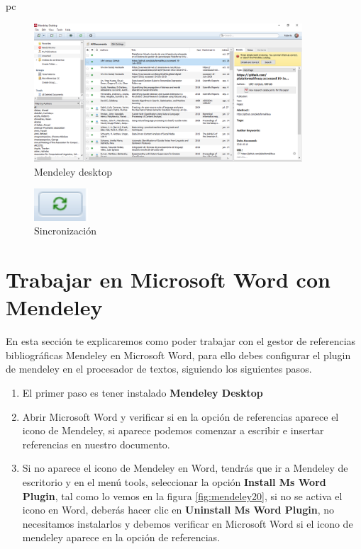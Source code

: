 pc\documentclass[a4paper,12pt,openany]{book}
\begin{document}
\begin{itemize}
\begin{enumerate}
    \begin{figure}[H]
    \centering
	\includegraphics[width=10cm]{mendeley3.png}
    \caption{Mendeley desktop}
    \label{fig:mendeley18}
    \end{figure}

    \begin{figure}[H]
    \centering
	\includegraphics[width=2cm]{mendeley5.png}
    \caption{Sincronización}
    \label{fig:mendeley19}
    \end{figure}
\end{enumerate}

\section{Trabajar en Microsoft Word con Mendeley}

En esta sección te explicaremos como poder trabajar con el gestor de referencias bibliográficas Mendeley en Microsoft Word, para ello debes configurar el plugin de mendeley en el procesador de textos, siguiendo los siguientes pasos.

\begin{enumerate}
    \item El primer paso es tener instalado \textbf{Mendeley Desktop}
    \item Abrir Microsoft Word y verificar si en la opción de referencias aparece el icono de Mendeley, si aparece podemos comenzar a escribir e insertar referencias en nuestro documento.
    \item Si no aparece el icono de Mendeley en Word, tendrás que ir a Mendeley de escritorio y en el menú tools, seleccionar la opción \textbf{Install Ms Word Plugin}, tal como lo vemos en la figura \ref{fig:mendeley20}, si no se activa el icono en Word, deberás hacer clic en \textbf{Uninstall Ms Word Plugin}, no necesitamos instalarlos y debemos verificar en Microsoft Word si el icono de mendeley aparece en la opción de referencias.
    

\end{enumerate}
\end{itemize}
\end{document}
